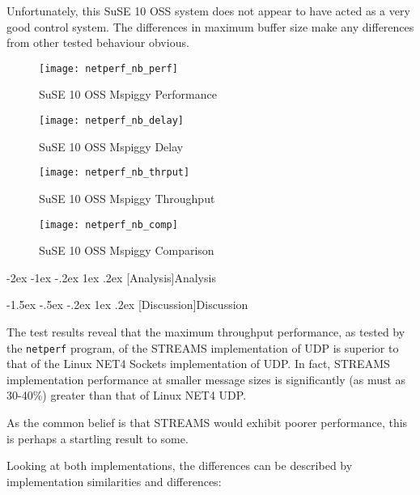 \documentclass[letterpaper,final,notitlepage,twocolumn,10pt,twoside]{article}
\makeatletter
\let\large\normalsize
\let\normalsize\small
\let\small\footnotesize
\let\footnotesize\scriptsize
\let\scriptsize\tiny
\renewcommand\section{\@startsection {section}{1}{\z@}%
                                   {-2ex \@plus -1ex \@minus -.2ex}%
                                   {1ex \@plus .2ex}%
                                   {\normalfont\large\bfseries}}
\renewcommand\subsection{\@startsection{subsection}{2}{\z@}%
                                     {-1.5ex \@plus -.5ex \@minus -.2ex}%
                                     {1ex \@plus .2ex}%
                                     {\normalfont\normalsize\bfseries}}
\makeatother
\begin{document}
Unfortunately, this SuSE 10 OSS system does not appear to have acted as a very
good control system.  The differences in maximum buffer size make any
differences from other tested behaviour obvious.

\begin{figure}[p]
\center\texttt{[image: netperf\_nb\_perf]}
\caption[SuSE 10 OSS Mspiggy Performance]{SuSE 10 OSS Mspiggy Performance}
\label{figure:nbperf}
\end{figure}

\begin{figure}[p]
\center\texttt{[image: netperf\_nb\_delay]}
\caption[SuSE 10 OSS Mspiggy Delay]{SuSE 10 OSS Mspiggy Delay}
\label{figure:nbdly}
\end{figure}

\begin{figure}[p]
\center\texttt{[image: netperf\_nb\_thrput]}
\caption[SuSE 10 OSS Mspiggy Throughput]{SuSE 10 OSS Mspiggy Throughput}
\label{figure:nbthrput}
\end{figure}

\begin{figure}[p]
\center\texttt{[image: netperf\_nb\_comp]}
\caption[SuSE 10 OSS Mspiggy Comparison]{SuSE 10 OSS Mspiggy Comparison}
\label{figure:nbcomp}
\end{figure}

\section[Analysis]{Analysis}

\subsection[Discussion]{Discussion}

The test results reveal that the maximum throughput performance, as tested by
the \texttt{netperf} program, of the STREAMS implementation of UDP is superior
to that of the Linux NET4 Sockets implementation of UDP.  In fact, STREAMS
implementation performance at smaller message sizes is significantly (as must
as 30-40\%) greater than that of Linux NET4 UDP.

As the common belief is that STREAMS would exhibit poorer performance, this is
perhaps a startling result to some.

Looking at both implementations, the differences can be described by
implementation similarities and differences:
\end{document}

